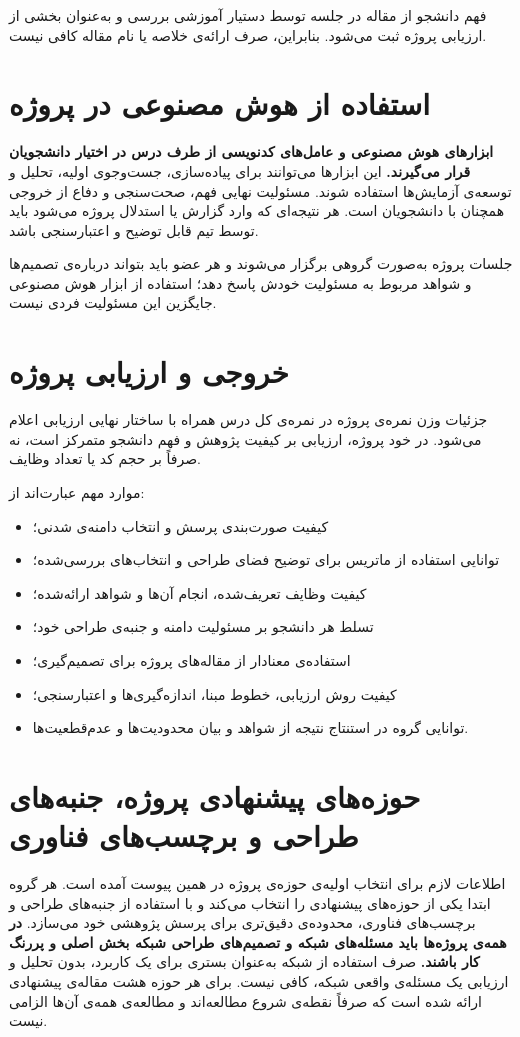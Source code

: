 \documentclass[12pt]{article}
\begin{document}
فهم دانشجو از مقاله در جلسه توسط دستیار آموزشی بررسی و به‌عنوان بخشی از ارزیابی پروژه ثبت می‌شود. بنابراین، صرف ارائه‌ی خلاصه یا نام مقاله کافی نیست.

\section{استفاده از هوش مصنوعی در پروژه}
\textbf{ابزارهای هوش مصنوعی و عامل‌های کدنویسی از طرف درس در اختیار دانشجویان قرار می‌گیرند.} این ابزارها می‌توانند برای پیاده‌سازی، جست‌وجوی اولیه، تحلیل و توسعه‌ی آزمایش‌ها استفاده شوند. مسئولیت نهایی فهم، صحت‌سنجی و دفاع از خروجی همچنان با دانشجویان است. هر نتیجه‌ای که وارد گزارش یا استدلال پروژه می‌شود باید توسط تیم قابل توضیح و اعتبارسنجی باشد.

جلسات پروژه به‌صورت گروهی برگزار می‌شوند و هر عضو باید بتواند درباره‌ی تصمیم‌ها و شواهد مربوط به مسئولیت خودش پاسخ دهد؛ استفاده از ابزار هوش مصنوعی جایگزین این مسئولیت فردی نیست.

\section{خروجی و ارزیابی پروژه}
جزئیات وزن نمره‌ی پروژه در نمره‌ی کل درس همراه با ساختار نهایی ارزیابی اعلام می‌شود. در خود پروژه، ارزیابی بر کیفیت پژوهش و فهم دانشجو متمرکز است، نه صرفاً بر حجم کد یا تعداد وظایف.

موارد مهم عبارت‌اند از:
\begin{itemize}[label=$\bullet$]
    \item کیفیت صورت‌بندی پرسش و انتخاب دامنه‌ی شدنی؛
    \item توانایی استفاده از ماتریس برای توضیح فضای طراحی و انتخاب‌های بررسی‌شده؛
    \item کیفیت وظایف تعریف‌شده، انجام آن‌ها و شواهد ارائه‌شده؛
    \item تسلط هر دانشجو بر مسئولیت دامنه و جنبه‌ی طراحی خود؛
    \item استفاده‌ی معنادار از مقاله‌های پروژه برای تصمیم‌گیری؛
    \item کیفیت روش ارزیابی، خطوط مبنا، اندازه‌گیری‌ها و اعتبارسنجی؛
    \item توانایی گروه در استنتاج نتیجه از شواهد و بیان محدودیت‌ها و عدم‌قطعیت‌ها.
\end{itemize}

\appendix
\section{حوزه‌های پیشنهادی پروژه، جنبه‌های طراحی و برچسب‌های فناوری}
اطلاعات لازم برای انتخاب اولیه‌ی حوزه‌ی پروژه در همین پیوست آمده است. هر گروه ابتدا یکی از حوزه‌های پیشنهادی را انتخاب می‌کند و با استفاده از جنبه‌های طراحی و برچسب‌های فناوری، محدوده‌ی دقیق‌تری برای پرسش پژوهشی خود می‌سازد. \textbf{در همه‌ی پروژه‌ها باید مسئله‌های شبکه و تصمیم‌های طراحی شبکه بخش اصلی و پررنگ کار باشند.} صرف استفاده از شبکه به‌عنوان بستری برای یک کاربرد، بدون تحلیل و ارزیابی یک مسئله‌ی واقعی شبکه، کافی نیست. برای هر حوزه هشت مقاله‌ی پیشنهادی ارائه شده است که صرفاً نقطه‌ی شروع مطالعه‌اند و مطالعه‌ی همه‌ی آن‌ها الزامی نیست.
\end{document}
